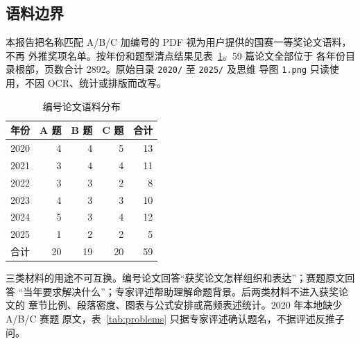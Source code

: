 \subsection{语料边界}

本报告把名称匹配 A/B/C 加编号的 PDF 视为用户提供的国赛一等奖论文语料，不再
外推奖项名单。按年份和题型清点结果见表~\ref{tab:corpus-count}。59 篇论文全部位于
各年份目录根部，页数合计 2892。原始目录 \texttt{2020/} 至 \texttt{2025/} 及思维
导图 \texttt{1.png} 只读使用，不因 OCR、统计或排版而改写。

\begin{table}[htbp]
\centering
\caption{编号论文语料分布}
\label{tab:corpus-count}
\begin{tabular}{crrrr}
\toprule
年份 & A 题 & B 题 & C 题 & 合计\\
\midrule
2020 & 4 & 4 & 5 & 13\\
2021 & 3 & 4 & 4 & 11\\
2022 & 3 & 3 & 2 & 8\\
2023 & 4 & 3 & 3 & 10\\
2024 & 5 & 3 & 4 & 12\\
2025 & 1 & 2 & 2 & 5\\
\midrule
合计 & 20 & 19 & 20 & 59\\
\bottomrule
\end{tabular}
\end{table}

三类材料的用途不可互换。编号论文回答“获奖论文怎样组织和表达”；赛题原文回答
“当年要求解决什么”；专家评述帮助理解命题背景。后两类材料不进入获奖论文的
章节比例、段落密度、图表与公式安排或高频表述统计。2020 年本地缺少 A/B/C 赛题
原文，表~\ref{tab:problems} 只据专家评述确认题名，不据评述反推子问。

